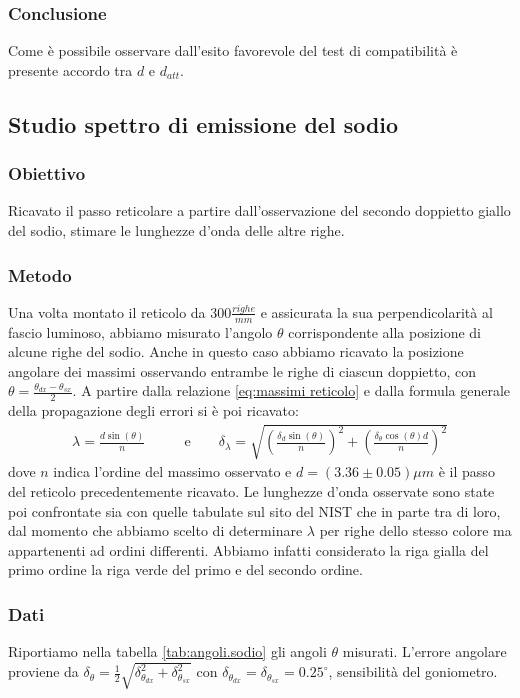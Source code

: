 \documentclass[a4paper]{article}
\begin{document}
\subsubsection{Conclusione}
Come è possibile osservare dall'esito favorevole del test di compatibilità è presente accordo tra $d$ e $d_{att}$. 

\subsection{Studio spettro di emissione del sodio}
\subsubsection{Obiettivo}
Ricavato il passo reticolare a partire dall'osservazione del secondo doppietto giallo del sodio, stimare le lunghezze d'onda delle altre righe.

\subsubsection{Metodo}
Una volta montato il reticolo da $300 \frac{righe}{mm}$ e assicurata la sua perpendicolarità al fascio luminoso, abbiamo misurato l'angolo $\theta$ corrispondente alla posizione di alcune righe del sodio. Anche in questo caso abbiamo ricavato la posizione angolare dei massimi osservando entrambe le righe di ciascun doppietto, con $\theta = \frac{\theta_{dx}-\theta_{sx}}{2}$. A partire dalla relazione \ref{eq:massimi reticolo} e dalla formula generale della propagazione degli errori si è poi ricavato:
\begin{align}
    \lambda = \frac{d\sin(\theta)}{n}  \qquad & \text{e} \qquad \delta_{\lambda} = \sqrt{\left(\frac{\delta_{d}\sin(\theta)}{n}\right)^2 + \left(\frac{\delta_{\theta}\cos(\theta)d}{n}\right)^2}
\label{eq:lambda_sodio}
\end{align}
dove $n$ indica l'ordine del massimo osservato e $d=(3.36\pm 0.05)\mu m$ è il passo del reticolo precedentemente ricavato.
Le lunghezze d'onda osservate sono state poi confrontate sia con quelle tabulate sul sito del NIST che in parte tra di loro, dal momento che abbiamo scelto di determinare $\lambda$ per righe dello stesso colore ma appartenenti ad ordini differenti. Abbiamo infatti considerato la riga gialla del primo ordine la riga verde del primo e del secondo ordine.

\subsubsection{Dati}
Riportiamo nella tabella \ref{tab:angoli.sodio} gli angoli $\theta$ misurati. L'errore angolare proviene da $\delta_{\theta}=\frac{1}{2}\sqrt{\delta_{\theta_{dx}}^2+\delta_{\theta_{sx}}^2}$ con 
$\delta_{\theta_{dx}} =\delta_{\theta_{sx}}= 0.25^\circ$, sensibilità del goniometro.
\end{document}
